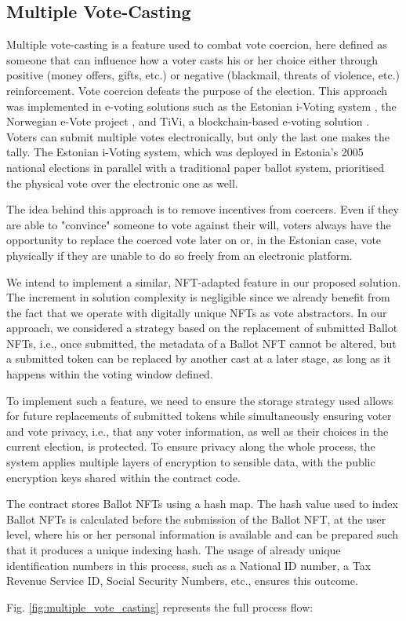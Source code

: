 \documentclass[../main.tex]{subfiles}
\begin{document}
\subsection{Multiple Vote-Casting}
\label{sec:multiple_vote_casting}
Multiple vote-casting is a feature used to combat vote coercion, here defined as someone that can influence how a voter casts his or her choice either through positive (money offers, gifts, etc.) or negative (blackmail, threats of violence, etc.) reinforcement. Vote coercion defeats the purpose of the election. This approach was implemented in e-voting solutions such as the Estonian i-Voting system \cite{Madise2006}, the Norwegian e-Vote project \cite{Barrat2012}, and TiVi, a blockchain-based e-voting solution \cite{TiVi2021}. Voters can submit multiple votes electronically, but only the last one makes the tally. The Estonian i-Voting system, which was deployed in Estonia's 2005 national elections in parallel with a traditional paper ballot system, prioritised the physical vote over the electronic one as well.
\par
The idea behind this approach is to remove incentives from coercers. Even if they are able to "convince" someone to vote against their will, voters always have the opportunity to replace the coerced vote later on or, in the Estonian case, vote physically if they are unable to do so freely from an electronic platform.
\par
We intend to implement a similar, NFT-adapted feature in our proposed solution. The increment in solution complexity is negligible since we already benefit from the fact that we operate with digitally unique NFTs as vote abstractors. In our approach, we considered a strategy based on the replacement of submitted Ballot NFTs, i.e., once submitted, the metadata of a Ballot NFT cannot be altered, but a submitted token can be replaced by another cast at a later stage, as long as it happens within the voting window defined.
\par
To implement such a feature, we need to ensure the storage strategy used allows for future replacements of submitted tokens while simultaneously ensuring voter and vote privacy, i.e., that any voter information, as well as their choices in the current election, is protected. To ensure privacy along the whole process, the system applies multiple layers of encryption to sensible data, with the public encryption keys shared within the contract code.
\par
The contract stores Ballot NFTs using a hash map. The hash value used to index Ballot NFTs is calculated before the submission of the Ballot NFT, at the user level, where his or her personal information is available and can be prepared such that it produces a unique indexing hash. The usage of already unique identification numbers in this process, such as a National ID number, a Tax Revenue Service ID, Social Security Numbers, etc., ensures this outcome.
\par
Fig. \ref{fig:multiple_vote_casting} represents the full process flow:
\end{document}

